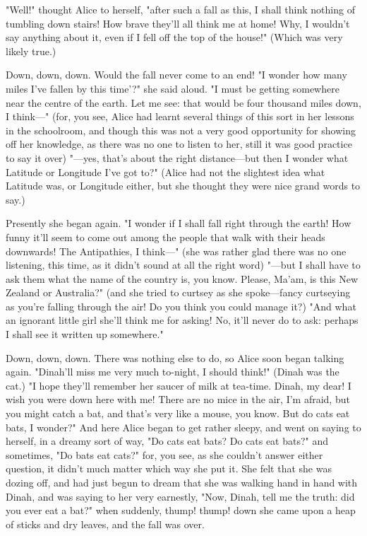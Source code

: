 "Well!" thought Alice to herself, "after such a fall as this, I shall think nothing of tumbling down stairs! How brave they'll all think me at home! Why, I wouldn't say anything about it, even if I fell off the top of the house!" (Which was very likely true.)

Down, down, down. Would the fall never come to an end! "I wonder how many miles I've fallen by this time'?" she said aloud. "I must be getting somewhere near the centre of the earth. Let me see: that would be four thousand miles down, I think—" (for, you see, Alice had learnt several things of this sort in her lessons in the schoolroom, and though this was not a very good opportunity for showing off her knowledge, as there was no one to listen to ​her, still it was good practice to say it over) "—yes, that's about the right distance—but then I wonder what Latitude or Longitude I've got to?" (Alice had not the slightest idea what Latitude was, or Longitude either, but she thought they were nice grand words to say.)

Presently she began again. "I wonder if I shall fall right through the earth! How funny it'll seem to come out among the people that walk with their heads downwards! The Antipathies, I think—" (she was rather glad there was no one listening, this time, as it didn't sound at all the right word) "—but I shall have to ask them what the name of the country is, you know. Please, Ma'am, is this New Zealand or Australia?" (and she tried to curtsey as she spoke—fancy curtseying as you're falling through the air! Do you think you could manage it?) "And what an ignorant little girl she'll think me for asking! No, it'll never do to ask: perhaps I shall see it written up somewhere."

​Down, down, down. There was nothing else to do, so Alice soon began talking again. "Dinah'll miss me very much to-night, I should think!" (Dinah was the cat.) "I hope they'll remember her saucer of milk at tea-time. Dinah, my dear! I wish you were down here with me! There are no mice in the air, I'm afraid, but you might catch a bat, and that's very like a mouse, you know. But do cats eat bats, I wonder?" And here Alice began to get rather sleepy, and went on saying to herself, in a dreamy sort of way, "Do cats eat bats? Do cats eat bats?" and sometimes, "Do bats eat cats?" for, you see, as she couldn't answer either question, it didn't much matter which way she put it. She felt that she was dozing off, and had just begun to dream that she was walking hand in hand with Dinah, and was saying to her very earnestly, "Now, Dinah, tell me the truth: did you ever eat a bat?" when suddenly, thump! thump! down she came upon a heap of sticks and dry leaves, and the fall was over.

